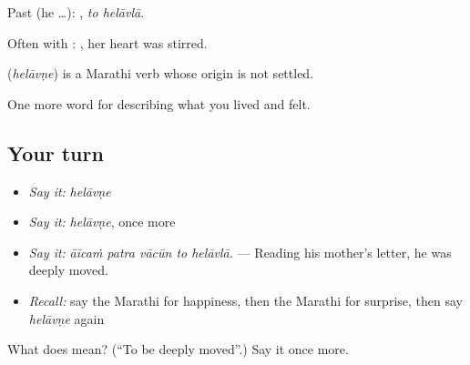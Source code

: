 Past (he …):  , \emph{to helāvlā}.

Often with :   , her heart was stirred.

\begin{cousinweb}
\textbf{} (\emph{helāvṇe}) is a Marathi verb whose origin is not settled.
\end{cousinweb}

\begin{grammarlens}[title={What you've built}]
One more word for describing what you lived and felt.
\end{grammarlens}

\subsection*{Your turn}
\begin{itemize}
\raggedright
  \item \emph{Say it:} \emph{helāvṇe}
  \item \emph{Say it:} \emph{helāvṇe}, once more
  \item \emph{Say it:} \emph{āīcaṁ patra vācūn to helāvlā.} — Reading his mother's letter, he was deeply moved.
  \item \emph{Recall:} say the Marathi for happiness, then the Marathi for surprise, then say \emph{helāvṇe} again
\end{itemize}

\begin{tcolorbox}[breakable,colback=teal!4,colframe=teal!35!black,title={Before you move on}]
What does  mean? (\textquotedblleft{}To be deeply moved\textquotedblright{}.) Say it once more.
\end{tcolorbox}
